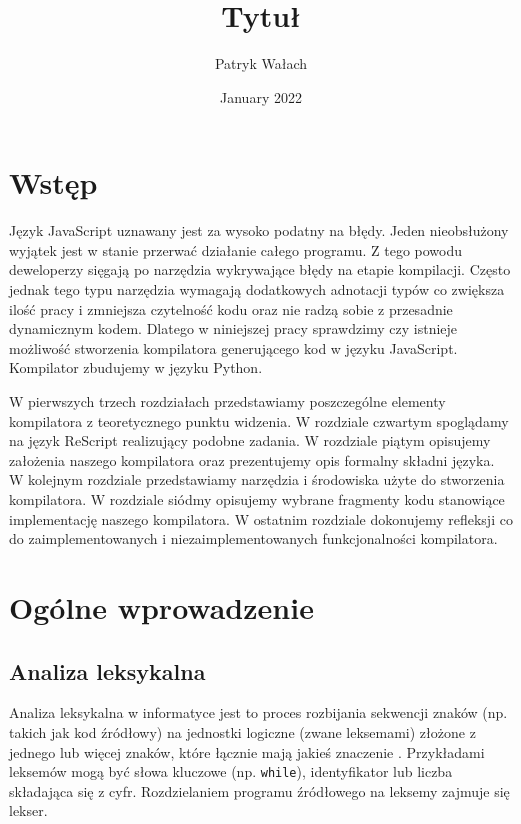 \documentclass{article}
\title{Tytuł}
\author{Patryk Wałach}
\date{January 2022}
\begin{document}
\maketitle
\tableofcontents

\section*{Wstęp}
Język JavaScript uznawany jest za wysoko podatny na błędy. Jeden nieobsłużony wyjątek jest w stanie przerwać działanie całego programu. Z tego powodu deweloperzy sięgają po narzędzia wykrywające błędy na etapie kompilacji. Często jednak tego typu narzędzia wymagają dodatkowych adnotacji typów co zwiększa ilość pracy i zmniejsza czytelność kodu oraz nie radzą sobie z przesadnie dynamicznym kodem. Dlatego w niniejszej pracy sprawdzimy czy istnieje możliwość stworzenia kompilatora generującego kod w języku JavaScript. Kompilator zbudujemy w języku Python.

W pierwszych trzech rozdziałach przedstawiamy poszczególne elementy kompilatora z teoretycznego punktu widzenia. W rozdziale czwartym spoglądamy na język ReScript realizujący podobne zadania. W rozdziale piątym opisujemy założenia naszego kompilatora oraz prezentujemy opis formalny składni języka. W kolejnym rozdziale przedstawiamy narzędzia i środowiska użyte do stworzenia kompilatora. W rozdziale siódmy opisujemy wybrane fragmenty kodu stanowiące implementację naszego kompilatora. W ostatnim rozdziale dokonujemy refleksji co do zaimplementowanych i niezaimplementowanych funkcjonalności kompilatora.

\section{Ogólne wprowadzenie}
\subsection{Analiza leksykalna}
Analiza leksykalna w informatyce jest to proces rozbijania sekwencji znaków (np. takich jak kod źródłowy) na jednostki logiczne (zwane leksemami) złożone z jednego lub więcej znaków, które łącznie mają jakieś znaczenie \cite{Hopcroft__Motwani__Ullman__2005}. Przykładami leksemów mogą być słowa kluczowe (np. \lstinline$while$), identyfikator lub liczba składająca się z cyfr. Rozdzielaniem programu źródłowego na leksemy zajmuje się lekser.
\end{document}
